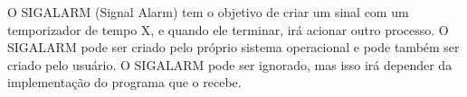 \begin{question}

  O SIGALARM (Signal Alarm) tem o objetivo de criar um sinal 
  com um temporizador de tempo X, e quando ele terminar, irá
  acionar outro processo. O SIGALARM pode ser criado pelo próprio 
  sistema operacional e pode também ser criado pelo usuário. O SIGALARM 
  pode ser ignorado, mas isso irá depender da implementação do programa
  que o recebe.

\end{question}
